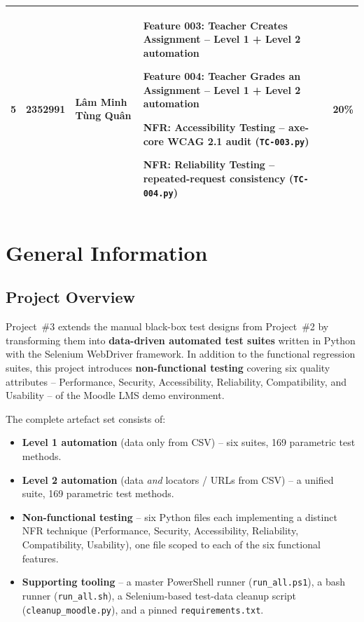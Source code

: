 \documentclass[twoside,final]{hcmut-report}
\begin{document}
\begin{table}[ht]
\begin{tabularx}{\textwidth}{|c|c|p{2.5cm}|>{\raggedright\arraybackslash}X|c|}
    5 & 2352991 & Lâm Minh Tùng Quân &
    \begin{filelist}
        \item Feature 003: Teacher Creates Assignment -- Level 1 + Level 2 automation
       \item Feature 004: Teacher Grades an Assignment -- Level 1 + Level 2 automation
       \item NFR: Accessibility Testing -- axe-core WCAG 2.1 audit (\texttt{TC-003.py})
        \item NFR: Reliability Testing -- repeated-request consistency (\texttt{TC-004.py})
    \end{filelist} & 20\% \\ \hline

    \end{tabularx}
\end{table}
\newpage

\section{General Information}

\subsection{Project Overview}
Project~\#3 extends the manual black-box test designs from Project~\#2 by transforming them into \textbf{data-driven automated test suites} written in Python with the Selenium WebDriver framework. In addition to the functional regression suites, this project introduces \textbf{non-functional testing} covering six quality attributes -- Performance, Security, Accessibility, Reliability, Compatibility, and Usability -- of the Moodle LMS demo environment.

The complete artefact set consists of:
\begin{itemize}
    \item \textbf{Level 1 automation} (data only from CSV) -- six suites, 169 parametric test methods.
    \item \textbf{Level 2 automation} (data \emph{and} locators / URLs from CSV) -- a unified suite, 169 parametric test methods.
    \item \textbf{Non-functional testing} -- six Python files each implementing a distinct NFR technique (Performance, Security, Accessibility, Reliability, Compatibility, Usability), one file scoped to each of the six functional features.
    \item \textbf{Supporting tooling} -- a master PowerShell runner (\texttt{run\_all.ps1}), a bash runner (\texttt{run\_all.sh}), a Selenium-based test-data cleanup script (\texttt{cleanup\_moodle.py}), and a pinned \texttt{requirements.txt}.
\end{itemize}
\end{document}
